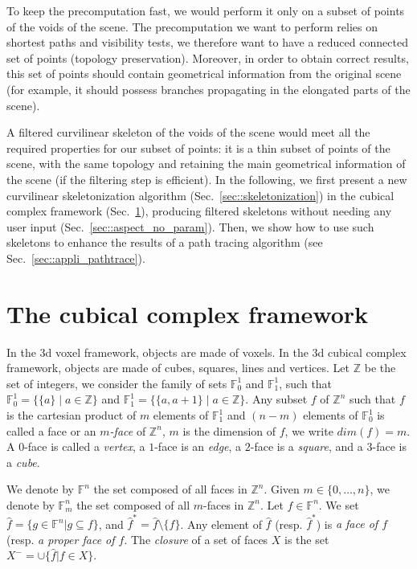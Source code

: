 \documentclass[final,envcountsame]{llncs}
\def\myem#1{{\em #1}}
\def\Z{\mathbb{Z}}
\def\allfaces#1{\mathbb{F}^{#1}}
\def\subfaces#1#2{\allfaces{#1}_{#2}}
\def\cell#1{\hat{#1}}
\def\cellstrict#1{\hat{#1}^*}
\def\closure#1{#1^-}
\def\suchthat{\;|\;}
\def\union{\cup}
\def\dinterval#1#2{\{#1,\ldots,#2\}}
\begin{document}
To keep the precomputation fast, we would perform it only on a subset of points of the voids of the scene. The precomputation we want to perform relies on shortest paths and visibility tests, we therefore want to have a reduced connected set of points (topology preservation). Moreover, in order to obtain correct results, this set of points should contain geometrical information from the original scene (for example, it should possess branches propagating in the elongated parts of the scene).

A filtered curvilinear skeleton of the voids of the scene would meet all the required properties for our subset of points: it is a thin subset of points of the scene, with the same topology and retaining the main geometrical information of the scene (if the filtering step is efficient). In the following, we first present a new curvilinear skeletonization algorithm (Sec.~\ref{sec::skeletonization}) in the cubical complex framework (Sec.~\ref{sec::binary_to_cubic}), producing filtered skeletons without needing any user input (Sec.~\ref{sec::aspect_no_param}). Then, we show how to use such skeletons to enhance the results of a path tracing algorithm (see Sec.~\ref{sec::appli_pathtrace}).


\section{The cubical complex framework}
\label{sec::binary_to_cubic}

In the 3d voxel framework, objects are made of voxels. In the 3d cubical complex framework, objects are made of cubes, squares, lines and vertices. 
Let $\Z$ be the set of integers, we consider the family of sets $\mathbb{F}^1_0$ and $\mathbb{F}^1_1$, such that $\mathbb{F}^1_0 = \{\{a\} \suchthat a \in \Z\}$ and $\mathbb{F}^1_1 = \{ \{a, a+1\} \suchthat a \in \Z\}$. Any subset $f$ of $\Z^n$ such that $f$ is the cartesian product of $m$ elements of $\mathbb{F}^1_1$ and $(n-m)$ elements of $\mathbb{F}^1_0$ is called a face or an \myem{$m$-face} of $\Z^n$, $m$ is the dimension of $f$, we write $dim(f)=m$. A $0$-face is called a \myem{vertex}, a $1$-face is an \myem{edge}, a $2$-face is a \myem{square}, and a $3$-face is a \myem{cube}.

We denote by $\allfaces{n}$ the set composed of all faces in $\Z^n$. Given $m \in \dinterval{0}{n}$, we denote by $\subfaces{n}{m}$ the set composed of all $m$-faces in $\Z^n$.
Let $f \in \allfaces{n}$. We set $\cell{f} = \{g \in \allfaces{n}\vert g \subseteq f\}$, and $\cellstrict{f} = \cell{f} \setminus \{f\}$. Any element of $\cell{f}$ (resp. $\cellstrict{f}$) is \myem{a face of $f$} (resp. \myem{a proper face of $f$}.
The \myem{closure} of a set of faces $X$ is the set $\closure{X}=\union\{\cell{f} \vert f \in X\}$.
\end{document}
